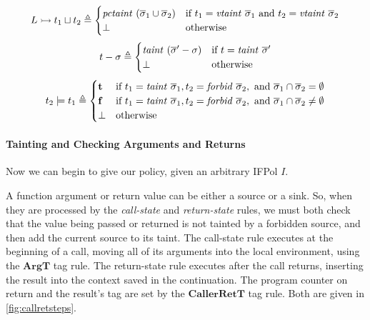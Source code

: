 \documentclass[acmsmall,review,anonymous]{acmart}\settopmatter{printfolios=true,printccs=false,printacmref=false}
\begin{document}
%
\[L \rightarrowtail t_1 \sqcup t_2 \triangleq
\begin{cases}
  \mathit{pctaint} ~ (\overline{\sigma}_1 \cup \overline{\sigma}_2) &
  \textnormal{if } t_1 = \mathit{vtaint} ~ \overline{\sigma}_1 \textnormal{ and }
  t_2 = \mathit{vtaint} ~ \overline{\sigma}_2\\
  \bot & \textnormal{otherwise} \\
\end{cases}\]
%
\[t - \sigma \triangleq
\begin{cases}
  \mathit{taint} ~ (\overline{\sigma}' - \sigma) &
  \textnormal{if } t = \mathit{taint} ~ \overline{\sigma}' \\
  \bot & \textnormal{otherwise} \\
\end{cases}\]
%
\[t_2 \models t_1 \triangleq
\begin{cases}
  \mathbf{t} & \textnormal{if } t_1 = \mathit{taint} ~ \overline{\sigma}_1,
  t_2 = \mathit{forbid} ~ \overline{\sigma}_2, \textnormal{ and }
  \overline{\sigma}_1 \cap \overline{\sigma}_2 = \emptyset \\
  \mathbf{f} & \textnormal{if } t_1 = \mathit{taint} ~ \overline{\sigma}_1,
  t_2 = \mathit{forbid} ~ \overline{\sigma}_2, \textnormal{ and }
  \overline{\sigma}_1 \cap \overline{\sigma}_2 \not = \emptyset \\
  \bot & \textnormal{otherwise} \\
\end{cases}\]

\paragraph{Tainting and Checking Arguments and Returns}

Now we can begin to give our policy, given an arbitrary IFPol \(I\).

A function argument or return value can be either a source or a sink.
So, when they are processed by the {\em call-state} and {\em return-state} rules,
we must both check that the value being passed or returned is not tainted by a forbidden
source, and then add the current source to its taint.
The call-state rule executes at the beginning of a call, moving all of its arguments into
the local environment, using the \(\mathbf{ArgT}\) tag rule.
The return-state rule executes after the call returns, inserting the result into the
context saved in the continuation. The program counter on return and the result's tag are
set by the \(\mathbf{CallerRetT}\) tag rule. Both are given in \cref{fig:callretsteps}.
\end{document}
